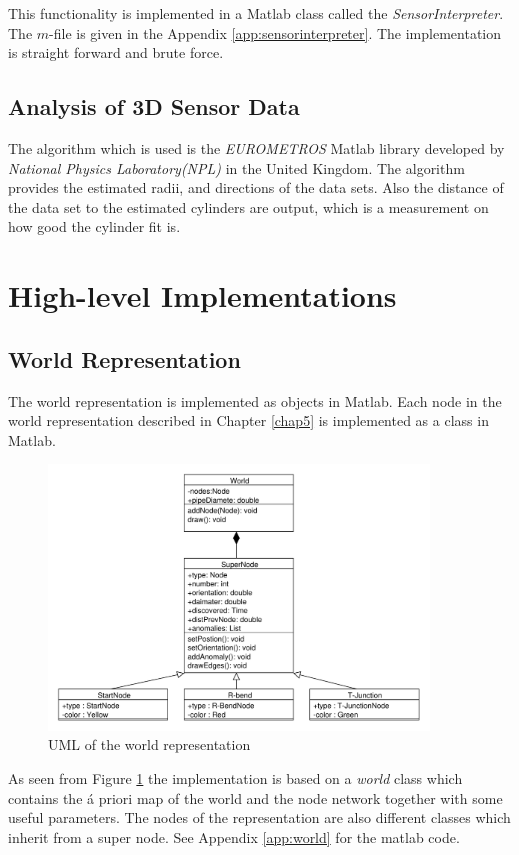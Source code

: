This functionality is implemented in a Matlab class called the \emph{SensorInterpreter}.
The $m$-file is given in the Appendix \ref{app:sensorinterpreter}. The implementation is
straight forward and brute force. 


\subsection{Analysis of 3D Sensor Data}
The algorithm which is used is the \emph{EUROMETROS}\cite{eurometros} Matlab library developed by
\emph{National Physics Laboratory(NPL)} in the United Kingdom. The algorithm provides the
estimated radii, and directions of the data sets. Also the distance of the data set to the
estimated cylinders are output, which is a measurement on how good the cylinder fit is. 


\section{High-level Implementations}

\subsection{World Representation}
The world representation is implemented as objects in Matlab. Each node in the world
representation described in Chapter \ref{chap5} is implemented as a class in Matlab. 
\begin{figure}[htbp]
    \centering
    \includegraphics[width=0.9\textwidth]{pics/world-uml}
    \caption{UML of the world representation}
    \label{chap6:fig-world-uml}
\end{figure}

As seen from Figure \ref{chap6:fig-world-uml} the implementation is based on a
\emph{world} class which contains the á priori map of the world and the node network
together with some useful parameters. The nodes of the representation are also different
classes which inherit from a super node. See Appendix \ref{app:world} for the matlab
code. 

